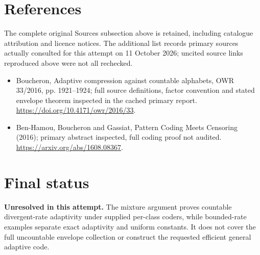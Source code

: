 \documentclass[11pt]{article}
\begin{document}
\section{References}
The complete original Sources subsection above is retained, including catalogue attribution and licence notices. The additional list records primary sources actually consulted for this attempt on 11 October 2026; uncited source links reproduced above were not all rechecked.
\begin{itemize}
\item Boucheron, Adaptive compression against countable alphabets, OWR 33/2016, pp. 1921--1924; full source definitions, factor convention and stated envelope theorem inspected in the cached primary report. \url{https://doi.org/10.4171/owr/2016/33}.
\item Ben-Hamou, Boucheron and Gassiat, Pattern Coding Meets Censoring (2016); primary abstract inspected, full coding proof not audited. \url{https://arxiv.org/abs/1608.08367}.
\end{itemize}
\section{Final status}
\textbf{Unresolved in this attempt.} The mixture argument proves countable divergent-rate adaptivity under supplied per-class coders, while bounded-rate examples separate exact adaptivity and uniform constants. It does not cover the full uncountable envelope collection or construct the requested efficient general adaptive code.
\end{document}
